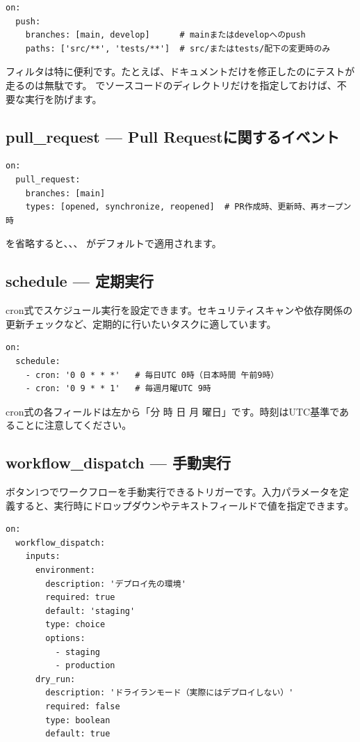 \begin{lstlisting}[language={}]
on:
  push:
    branches: [main, develop]      # mainまたはdevelopへのpush
    paths: ['src/**', 'tests/**']  # src/またはtests/配下の変更時のみ
\end{lstlisting}

 フィルタは特に便利です。たとえば、ドキュメントだけを修正したのにテストが走るのは無駄です。 でソースコードのディレクトリだけを指定しておけば、不要な実行を防げます。

\subsection{pull\_request --- Pull Requestに関するイベント}

\begin{lstlisting}[language={}]
on:
  pull_request:
    branches: [main]
    types: [opened, synchronize, reopened]  # PR作成時、更新時、再オープン時
\end{lstlisting}

 を省略すると、、、 がデフォルトで適用されます。

\subsection{schedule --- 定期実行}

cron式でスケジュール実行を設定できます。セキュリティスキャンや依存関係の更新チェックなど、定期的に行いたいタスクに適しています。

\begin{lstlisting}[language={}]
on:
  schedule:
    - cron: '0 0 * * *'   # 毎日UTC 0時（日本時間 午前9時）
    - cron: '0 9 * * 1'   # 毎週月曜UTC 9時
\end{lstlisting}

cron式の各フィールドは左から「分 時 日 月 曜日」です。時刻はUTC基準であることに注意してください。

\subsection{workflow\_dispatch --- 手動実行}

ボタン1つでワークフローを手動実行できるトリガーです。入力パラメータを定義すると、実行時にドロップダウンやテキストフィールドで値を指定できます。

\begin{lstlisting}[language={}]
on:
  workflow_dispatch:
    inputs:
      environment:
        description: 'デプロイ先の環境'
        required: true
        default: 'staging'
        type: choice
        options:
          - staging
          - production
      dry_run:
        description: 'ドライランモード（実際にはデプロイしない）'
        required: false
        type: boolean
        default: true
\end{lstlisting}

